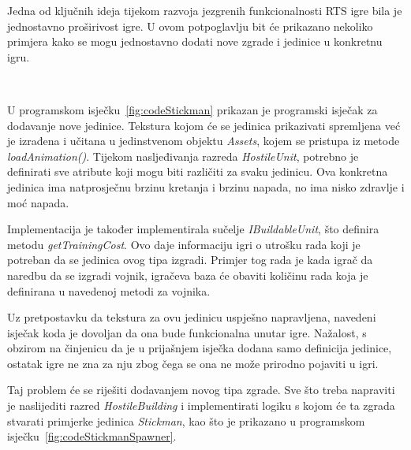 \documentclass[times, utf8, zavrsni, numeric]{fer}
\begin{document}
Jedna od ključnih ideja tijekom razvoja jezgrenih funkcionalnosti RTS igre bila je jednostavno proširivost igre.
U ovom potpoglavlju bit će prikazano nekoliko primjera kako se mogu jednostavno dodati nove zgrade i jedinice u konkretnu igru.

\begin{minipage}{\textwidth}
	
\end{minipage}\

\par U programskom isječku~\ref{fig:codeStickman} prikazan je programski isječak za dodavanje nove jedinice.
Tekstura kojom će se jedinica prikazivati spremljena već je izrađena i učitana u jedinstvenom objektu \textit{Assets}, kojem se pristupa iz metode \textit{loadAnimation()}.
Tijekom nasljeđivanja razreda \textit{HostileUnit}, potrebno je definirati sve atribute koji mogu biti različiti za svaku jedinicu.
Ova konkretna jedinica ima natprosječnu brzinu kretanja i brzinu napada, no ima nisko zdravlje i moć napada.

\par Implementacija je također implementirala sučelje \textit{IBuildableUnit}, što definira metodu \textit{getTrainingCost}.
Ovo daje informaciju igri o utrošku rada koji je potreban da se jedinica ovog tipa izgradi.
Primjer tog rada je kada igrač da naredbu da se izgradi vojnik, igračeva baza će obaviti količinu rada koja je definirana u navedenoj metodi za vojnika.

\par Uz pretpostavku da tekstura za ovu jedinicu uspješno napravljena, navedeni isječak koda je dovoljan da ona bude funkcionalna unutar igre.
Nažalost, s obzirom na činjenicu da je u prijašnjem isječka dodana samo definicija jedinice, ostatak igre ne zna za nju zbog čega se ona ne može prirodno pojaviti u igri.

\par Taj problem će se riješiti dodavanjem novog tipa zgrade.
Sve što treba napraviti je naslijediti razred \textit{HostileBuilding} i implementirati logiku s kojom će ta zgrada stvarati primjerke jedinica \textit{Stickman}, kao što je prikazano u programskom isječku~\ref{fig:codeStickmanSpawner}.

\vspace{3mm}
\begin{minipage}{\textwidth}
	
\end{minipage}\
\end{document}
